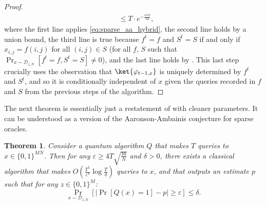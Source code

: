 \documentclass[11pt]{article}%
\newtheorem{theorem}{Theorem}
\newcommand{\eps}{\varepsilon}
\begin{document}
\begin{proof}
\begin{align*}
&\le T \cdot e^{-\frac{\alpha^4 k}{32}},
\end{align*}
where the first line applies \eqref{eq:sparse_aa_hybrid}, the second line holds by a union bound, the third line is true because $f^t = f$ and $S^t = S$ if and only if $x_{i,j} = f(i,j)$ for all $(i, j) \in S$ (for all $f$, $S$ such that $\Pr_{x \sim \mathcal{D}_{z,N}}\left[f^t = f, S^t = S\right] \neq 0$), and the last line holds by . This last step crucially uses the observation that $\ket{\varphi_{t-1,x}}$ is uniquely determined by $f^t$ and $S^t$, and so it is conditionally independent of $x$ given the queries recorded in $f$ and $S$ from the previous steps of the algorithm.
\end{proof}

The next theorem is essentially just a restatement of  with cleaner parameters. It can be understood as a version of the Aaronson-Ambainis conjecture \cite[Conjecture 1.5]{AA14} for sparse oracles.

\begin{theorem}
\label{thm:sparse_aa_parameterized}
Consider a quantum algorithm $Q$ that makes $T$ queries to $x \in \{0,1\}^{MN}$. Then for any $\eps \ge 4T\sqrt{\frac{16}{N}}$ and $\delta > 0$, there exists a classical algorithm that makes $O\left(\frac{T^5}{\eps^4}\log \frac{T}{\delta}\right)$ queries to $x$, and that outputs an estimate $p$ such that for any $z \in \{0,1\}^M$:
\[
\Pr_{x \sim \mathcal{D}_{z,N}} \left[|\Pr[Q(x) = 1] - p| \ge \eps \right] \le \delta.
\]
\end{theorem}
\end{document}
